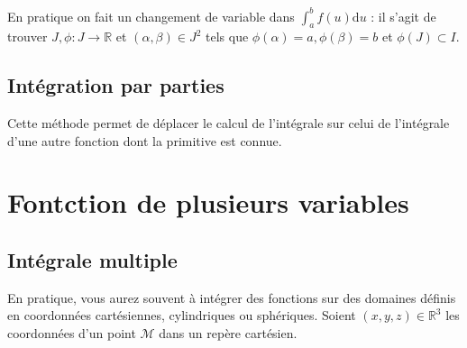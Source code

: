 
En pratique on fait un changement de variable dans $\int_a^b f(u) \mathrm{d} u$ : il s'agit de trouver $J, \phi: J \rightarrow \mathbb{R}$ et $(\alpha, \beta) \in J^2$ tels que $\phi(\alpha)=a, \phi(\beta)=b$ et $\phi(J) \subset I$.

\subsection{Intégration par parties}


Cette méthode permet de déplacer le calcul de l'intégrale sur celui de l'intégrale d'une autre fonction dont la primitive est connue.

\section{Fontction de plusieurs variables}
\subsection{Intégrale multiple}


En pratique, vous aurez souvent à intégrer des fonctions sur des domaines définis en coordonnées cartésiennes, cylindriques ou sphériques. Soient $(x, y, z) \in \mathbb{R}^3$ les coordonnées d'un point $\mathcal{M}$ dans un repère cartésien. 

